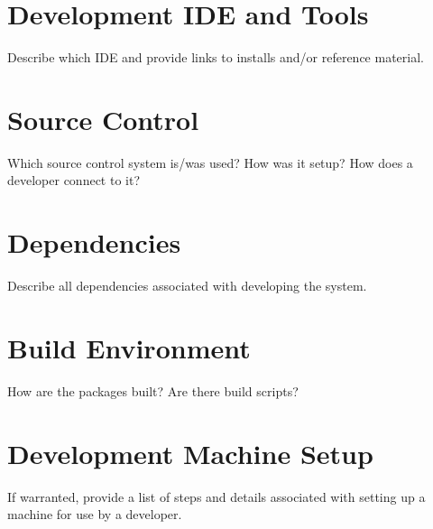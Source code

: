 \section{Development IDE and Tools}
Describe which IDE and provide links to installs and/or reference material. 

\section{Source  Control}
Which source control system is/was used?  How was it setup?  How does a developer 
connect to it? 

\section{Dependencies}
Describe all dependencies associated with developing the system. 

\section{Build  Environment}
How are the packages built?  Are there build scripts? 

\section{Development Machine Setup}
If warranted, provide a list of steps and details associated with setting up a 
machine for use by a developer. 


